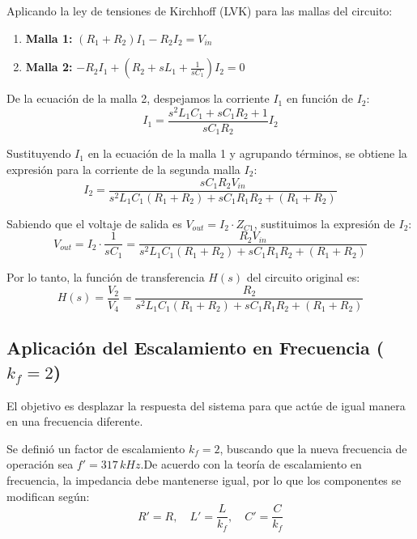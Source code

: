 Aplicando la ley de tensiones de Kirchhoff (LVK) para las mallas del circuito:
\begin{enumerate}
	\item \textbf{Malla 1:} $(R_1 + R_2)I_1 - R_2 I_2 = V_{in}$
	\item \textbf{Malla 2:} $-R_2 I_1 + (R_2 + sL_1 + \frac{1}{sC_1})I_2 = 0$
\end{enumerate}

De la ecuación de la malla 2, despejamos la corriente $I_1$ en función de $I_2$:
\begin{equation}
	I_1 = \frac{s^2 L_1 C_1 + s C_1 R_2 + 1}{s C_1 R_2} I_2
\end{equation}

Sustituyendo $I_1$ en la ecuación de la malla 1 y agrupando términos, se obtiene la expresión para la corriente de la segunda malla $I_2$:
\begin{equation}
	I_2 = \frac{s C_1 R_2 V_{in}}{s^2 L_1 C_1 (R_1 + R_2) + s C_1 R_1 R_2 + (R_1 + R_2)}
\end{equation}

Sabiendo que el voltaje de salida es $V_{out} = I_2 \cdot Z_{C1}$, sustituimos la expresión de $I_2$:
\begin{equation}
	V_{out} = I_2 \cdot \frac{1}{s C_1} = \frac{R_2 V_{in}}{s^2 L_1 C_1 (R_1 + R_2) + s C_1 R_1 R_2 + (R_1 + R_2)}
\end{equation}

Por lo tanto, la función de transferencia $H(s)$ del circuito original es:
\begin{equation}
	H(s) = \frac{V_2}{V_4} = \frac{R_2}{s^2 L_1 C_1 (R_1 + R_2) + s C_1 R_1 R_2 + (R_1 + R_2)}
\end{equation}

\subsection{Aplicación del Escalamiento en Frecuencia ($k_f = 2$)}
El objetivo es desplazar la respuesta del sistema para que actúe de igual manera en una frecuencia diferente. 

Se definió un factor de escalamiento $k_f = 2$, buscando que la nueva frecuencia de operación sea $f' = 317 \, kHz$.De acuerdo con la teoría de escalamiento en frecuencia, la impedancia debe mantenerse igual, por lo que los componentes se modifican según:\begin{equation}R' = R, \quad L' = \frac{L}{k_f}, \quad C' = \frac{C}{k_f}\end{equation}

